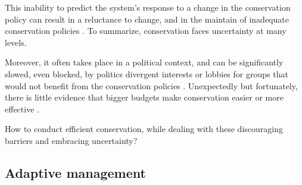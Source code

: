 \documentclass[12pt,a4paper]{article}
\begin{document}
This inability to predict the system's response to a change in the conservation policy can result in a reluctance to change, and in the maintain of inadequate conservation policies \citep{keith2011uncertainty, peterson2005conservation}.
To summarize, conservation faces uncertainty at many levels.

Moreover, it often takes place in a political context, and can be significantly slowed, even blocked, by politics divergent interests or lobbies for groups that would not benefit from the conservation policies \citep{keith2011uncertainty}.
Unexpectedly but fortunately, there is little evidence that bigger budgets make conservation easier or more effective \citep{game2013conservation}.

How to conduct efficient conservation, while dealing with these discouraging barriers and embracing uncertainty?

\subsection{Adaptive management}
%
\end{document}
